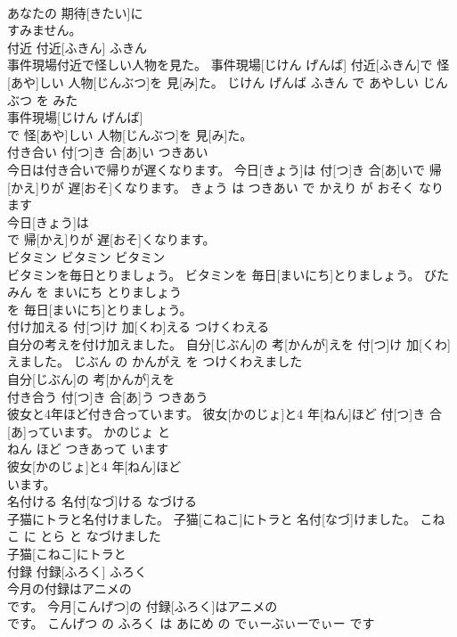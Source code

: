 \documentclass[8pt]{extreport}
\begin{document}
\begin{CJK}{UTF8}{min}
\\	あなたの 期待[きたい]に
\\	すみません。			
\\	付近	付近[ふきん]	ふきん	
\\	事件現場付近で怪しい人物を見た。	事件現場[じけん げんば] 付近[ふきん]で 怪[あや]しい 人物[じんぶつ]を 見[み]た。	じけん げんば ふきん で あやしい じんぶつ を みた	
\\	事件現場[じけん げんば]
\\	で 怪[あや]しい 人物[じんぶつ]を 見[み]た。			
\\	付き合い	付[つ]き 合[あ]い	つきあい	
\\	今日は付き合いで帰りが遅くなります。	今日[きょう]は 付[つ]き 合[あ]いで 帰[かえ]りが 遅[おそ]くなります。	きょう は つきあい で かえり が おそく なります	
\\	今日[きょう]は
\\	で 帰[かえ]りが 遅[おそ]くなります。			
\\	ビタミン	ビタミン	ビタミン	
\\	ビタミンを毎日とりましょう。	ビタミンを 毎日[まいにち]とりましょう。	びたみん を まいにち とりましょう	
\\	を 毎日[まいにち]とりましょう。			
\\	付け加える	付[つ]け 加[くわ]える	つけくわえる	
\\	自分の考えを付け加えました。	自分[じぶん]の 考[かんが]えを 付[つ]け 加[くわ]えました。	じぶん の かんがえ を つけくわえました	
\\	自分[じぶん]の 考[かんが]えを
\\	付き合う	付[つ]き 合[あ]う	つきあう	
\\	彼女と4年ほど付き合っています。	彼女[かのじょ]と4 年[ねん]ほど 付[つ]き 合[あ]っています。	かのじょ と 
\\	ねん ほど つきあって います	
\\	彼女[かのじょ]と4 年[ねん]ほど
\\	います。			
\\	名付ける	名付[なづ]ける	なづける	
\\	子猫にトラと名付けました。	子猫[こねこ]にトラと 名付[なづ]けました。	こねこ に とら と なづけました	
\\	子猫[こねこ]にトラと
\\	付録	付録[ふろく]	ふろく	
\\	今月の付録はアニメの
\\	です。	今月[こんげつ]の 付録[ふろく]はアニメの 
\\	[でぃーぶぃーでぃー]です。	こんげつ の ふろく は あにめ の でぃーぶぃーでぃー です	

\end{CJK}
\end{document}
